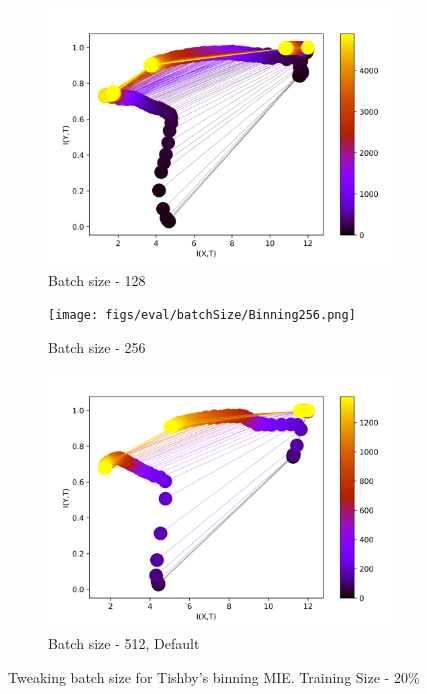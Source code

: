 \documentclass[dissertation.tex]{subfiles}
\begin{document}
\begin{figure}[ht]
  \begin{subfigure}[t]{0.3332\textwidth}
    \centering
    \includegraphics[width=\textwidth]{figs/eval/batchSize/Binning128.png}
    \caption{
      Batch size - 128
    }
    \label{figBatchSize128}
  \end{subfigure}
  \centering
  \begin{subfigure}[t]{0.3\textwidth}
    \centering
    \texttt{[image: figs/eval/batchSize/Binning256.png]}
    \caption{
      Batch size - 256
    }
    \label{figBatchSize256}
  \end{subfigure}
  \begin{subfigure}[t]{0.3332\textwidth}
    \centering
    \includegraphics[width=\textwidth]{figs/eval/batchSize/Binning512.png}
    \caption{
      Batch size - 512, Default
    }
    \label{figBatchSize512}
  \end{subfigure}
  \label{figBatchSize}
  \caption{
      Tweaking batch size for Tishby's binning MIE. Training Size - 20\%
    }
\end{figure}
\end{document}
